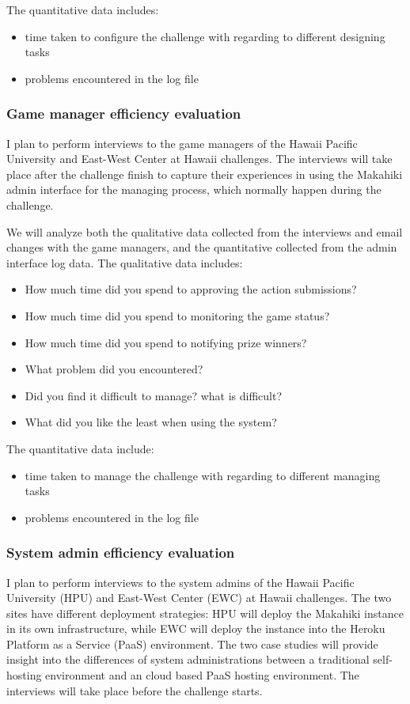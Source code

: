 The quantitative data includes:
\begin{itemize}
 \item time taken to configure the challenge with regarding to different designing tasks
 \item problems encountered in the log file
\end{itemize}

\subsubsection{Game manager efficiency evaluation}
I plan to perform interviews to the game managers of the Hawaii Pacific University and East-West Center at Hawaii challenges. The interviews will take place after the challenge finish to capture their experiences in using the Makahiki admin interface for the managing process, which normally happen during the challenge.

We will analyze both the qualitative data collected from the interviews and email changes with the game managers, and the quantitative collected from the admin interface log data. The qualitative data includes:
\begin{itemize}
\item How much time did you spend to approving the action submissions?
\item How much time did you spend to monitoring the game status?
\item How much time did you spend to notifying prize winners?
\item What problem did you encountered?
\item Did you find it difficult to manage? what is difficult?
\item What did you like the least when using the system?
\end{itemize}

The quantitative data include:
\begin{itemize}
 \item time taken to manage the challenge with regarding to different managing tasks
 \item problems encountered in the log file
\end{itemize}

\subsubsection{System admin efficiency evaluation}
I plan to perform interviews to the system admins of the Hawaii Pacific University (HPU) and East-West Center (EWC) at Hawaii challenges. The two sites have different deployment strategies: HPU will deploy the Makahiki instance in its own infrastructure, while EWC will deploy the instance into the Heroku Platform as a Service (PaaS) environment. The two case studies will provide insight into the differences of system administrations between a traditional self-hosting environment and an cloud based PaaS hosting environment. The interviews will take place before the challenge starts.


